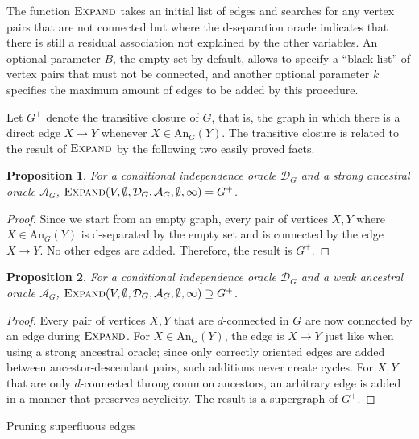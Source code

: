 \documentclass{uai2025} %
\newtheorem{proposition}{Proposition}
\begin{document}
The function $\textsc{Expand}$ takes an initial list of edges and searches for 
any vertex pairs that are not connected but where the d-separation oracle 
indicates  that there is still a residual association not explained by the other variables.
An optional parameter $B$, the empty set by default, allows to specify a ``black list''
of vertex pairs that must not be connected, and another optional parameter $k$
specifies the maximum amount of edges to be added by this procedure.

Let $G^+$ denote the transitive closure of $G$, that is, the graph in which 
there is a direct edge $X \to Y$ whenever $X \in \textrm{An}_G(Y)$. The transitive
closure is related to the result of $\textsc{Expand}$ by the following two 
easily proved facts.

\begin{proposition}
For a conditional independence oracle
 $\mathcal{D}_G$ and a strong ancestral oracle $\mathcal{A}_G$, 
$\textsc{Expand}(V,\emptyset,\mathcal{D}_G,\mathcal{A}_G, \emptyset, \infty)=G^+$.
\label{prop:strongexpand}
\end{proposition}

\begin{proof}
Since we start from an empty graph, every pair of vertices $X, Y$ where
 $X \in \textrm{An}_G(Y)$ is d-separated by the empty set and is
 connected by the edge $X \to Y$. No other edges are added. Therefore, 
the result is $G^+$. 
\end{proof}

\begin{proposition}
For a conditional independence oracle
 $\mathcal{D}_G$ and a weak ancestral oracle $\mathcal{A}_G$, 
$\textsc{Expand}(V,\emptyset,\mathcal{D}_G,\mathcal{A}_G, \emptyset, \infty)
\supseteq G^+$.
\label{prop:weakexpand}
\end{proposition}

\begin{proof}
Every pair of vertices $X, Y$ that are $d$-connected in $G$ are now connected by an edge 
during $\textsc{Expand}$. For $X \in \textrm{An}_G(Y)$, the edge is 
$X \to Y$ just like when using a strong ancestral oracle; since only correctly oriented
edges are added between ancestor-descendant pairs, such additions never create cycles.
For $X, Y$ that are only $d$-connected throug common ancestors, an arbitrary 
edge is added in a manner that preserves acyclicity. The result is a supergraph
of $G^+$.
\end{proof}


\begin{algorithm}[h]
\DontPrintSemicolon
\SetAlgoLined

\caption{Pruning superfluous edges}
\label{algo:prune}
\end{algorithm}
\end{document}
